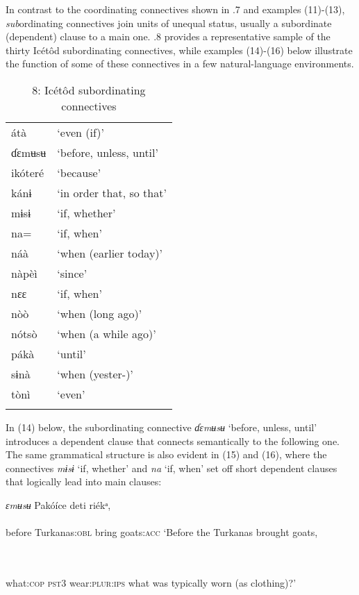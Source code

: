 In contrast to the coordinating connectives shown in .7 and examples (11)-(13), \textit{sub}ordinating connectives join units of unequal status, usually a subordinate (dependent) clause to a main one. .8 provides a representative sample of the thirty Icétôd subordinating connectives, while examples (14)-(16) below illustrate the function of some of these connectives in a few natural-language environments.


\begin{table}
\caption{8: Icétôd subordinating connectives}
\label{tab:3}


\begin{tabularx}{\textwidth}{XX}
\lsptoprule

átà & ‘even (if)’\\
ɗɛmʉsʉ & ‘before, unless, until’\\
ikóteré & ‘because’\\
kánɨ & ‘in order that, so that’\\
mɨsɨ & ‘if, whether’\\
na= & ‘if, when’\\
náà & ‘when (earlier today)’\\
nàpèì & ‘since’\\
nɛɛ & ‘if, when’\\
nòò & ‘when (long ago)’\\
nótsò & ‘when (a while ago)’\\
pákà & ‘until’\\
sɨnà & ‘when (yester-)’\\
tònì & ‘even’\\
\lspbottomrule
\end{tabularx}
\end{table}
In (14) below, the subordinating connective \textit{ɗɛmʉsʉ} ‘before, unless, until’ introduces a dependent clause that connects semantically to the following one. The same grammatical structure is also evident in (15) and (16), where the connectives \textit{mɨsɨ} ‘if, whether’ and \textit{na} ‘if, when’ set off short dependent clauses that logically lead into main clauses:



\ea\label{ex:}
\textit{ɛmʉsʉ}   Pakóíce     deti   riékᵃ, \\
    \\
before   Turkanas:\textsc{obl}   bring   goats:\textsc{acc}
\glt ‘Before the Turkanas brought goats, 
\z



\ea\label{ex:}
 \\
    \\
what:\textsc{cop}   \textsc{pst3}   wear:\textsc{plur:ips}
\glt what was typically worn (as clothing)?’
\z  



